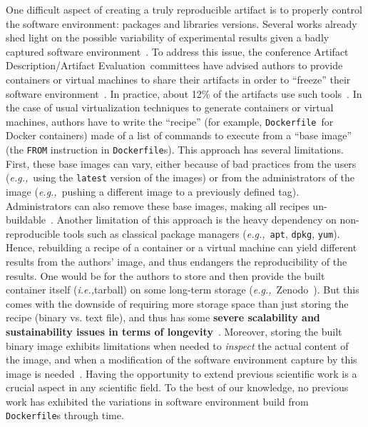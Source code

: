\documentclass[sigconf,natbib=false]{acmart}
\newcommand{\ie}{\emph{i.e.,}}
\newcommand{\eg}{\emph{e.g.,}}
\newcommand{\ad}{Artifact Description}
\newcommand{\aeval}{Artifact Evaluation}
\newcommand{\adae}{\ad/\aeval}
\newcommand{\df}{\texttt{Dockerfile}}
\begin{document}
One difficult aspect of creating a truly reproducible artifact is to properly control the software environment: packages and libraries versions.
Several works already shed light on the possible variability of experimental results given a badly captured software environment~\cite{mytkowicz_producing_nodate, sokolowski2024impact}.
To address this issue, the conference \adae\ committees have advised authors to provide containers or virtual machines to share their artifacts in order to ``freeze'' their software environment~\cite{eurosys25, aetips, csartifacts}.
In practice, about 12\% of the artifacts use such tools~\cite{guilloteau2024longevity}.
In the case of usual virtualization techniques to generate containers or virtual machines, authors have to write the ``recipe'' (for example, \df\ for Docker containers) made of a list of commands to execute from a ``base image'' (the \texttt{FROM} instruction in \df s).
This approach has several limitations.
First, these base images can vary, either because of bad practices from the users (\eg\ using the \texttt{latest} version of the images) or from the administrators of the image (\eg\ pushing a different image to a previously defined tag).
Administrators can also remove these base images, making all recipes un-buildable~\cite{nvidia_cuda_lifetime}.
Another limitation of this approach is the heavy dependency on non-reproducible tools such as classical package managers (\eg\ \texttt{apt}, \texttt{dpkg}, \texttt{yum}).
Hence, rebuilding a recipe of a container or a virtual machine can yield different results from the authors' image, and thus endangers the reproducibility of the results.
One would be for the authors to store and then provide the built container itself (\ie tarball) on some long-term storage (\eg\ Zenodo~\cite{zenodo}).
But this comes with the downside of requiring more storage space than just storing the recipe (binary vs. text file), and thus has some \textbf{severe scalability and sustainability issues in terms of longevity}~\cite{monroe2023preservation, guilloteau2024longevity}.
Moreover, storing the built binary image exhibits limitations when needed to \emph{inspect} the actual content of the image, and when a modification of the software environment capture by this image is needed~\cite{mercier2018considering}.
Having the opportunity to extend previous scientific work is a crucial aspect in any scientific field.
To the best of our knowledge, no previous work has exhibited the variations in software environment build from \df s through time.
\end{document}
